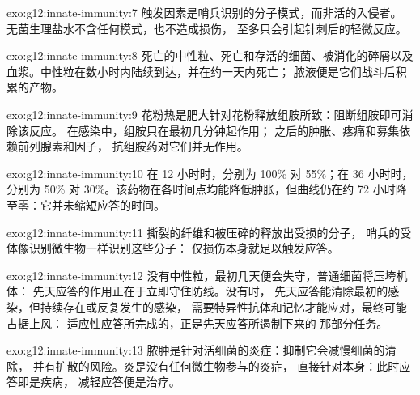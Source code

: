\begin{solution}{exo:g12:innate-immunity:7}
触发因素是哨兵识别的分子模式，而非活的入侵者。
无菌生理盐水不含任何模式，也不造成损伤，
至多只会引起针刺后的轻微反应。
\end{solution}

\begin{solution}{exo:g12:innate-immunity:8}
死亡的中性粒、死亡和存活的细菌、被消化的碎屑以及
血浆。中性粒在数小时内陆续到达，并在约一天内死亡；
脓液便是它们战斗后积累的产物。
\end{solution}

\begin{solution}{exo:g12:innate-immunity:9}
花粉热是肥大针对花粉释放组胺所致：阻断组胺即可消除该反应。
在感染中，组胺只在最初几分钟起作用；
之后的肿胀、疼痛和募集依赖前列腺素和因子，
抗组胺药对它们并无作用。
\end{solution}

\begin{solution}{exo:g12:innate-immunity:10}
在 12 小时时，分别为 100\% 对 55\%；在 36 小时时，分别为
50\% 对 30\%。该药物在各时间点均能降低肿胀，但曲线仍在约
72 小时降至零：它并未缩短应答的时间。
\end{solution}

\begin{solution}{exo:g12:innate-immunity:11}
撕裂的纤维和被压碎的释放出受损的分子，
哨兵的受体像识别微生物一样识别这些分子：
仅损伤本身就足以触发应答。
\end{solution}

\begin{solution}{exo:g12:innate-immunity:12}
没有中性粒，最初几天便会失守，普通细菌将压垮机体：
先天应答的作用正在于立即守住防线。没有时，
先天应答能清除最初的感染，但持续存在或反复发生的感染，
需要特异性抗体和记忆才能应对，最终可能占据上风：
适应性应答所完成的，正是先天应答所遏制下来的
那部分任务。
\end{solution}

\begin{solution}{exo:g12:innate-immunity:13}
脓肿是针对活细菌的炎症：抑制它会减慢细菌的清除，
并有扩散的风险。炎是没有任何微生物参与的炎症，
直接针对本身：此时应答即是疾病，
减轻应答便是治疗。
\end{solution}


